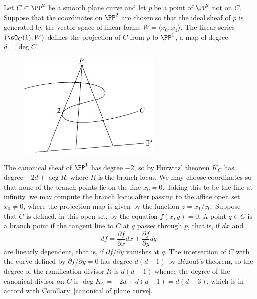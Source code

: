 \begin{example}
Let $C\subset \PP^2$ be a smooth plane curve and let $p$ be a point of $\PP^2$ not on $C$. Suppose that the coordinates on $\PP^2$ are chosen so that the ideal sheaf of $p$ is  
 generated by the vector space of linear forms $W = \langle x_0,x_1\rangle$. 
The linear series $(\sO_C(1), W)$ defines the projection of $C$ from $p$ to $\PP^1$, a map of degree
$d = \deg C$.

\begin{figure}   %
\centerline {\includegraphics[height=2in]{"main/Fig02-ProjectionPlaneCubic"}}
\end{figure}

The canonical sheaf of $\PP^1$ has degree $-2$, so by Hurwitz' theorem
$K_C$ has degree $ -2d+ \deg R$, where $R$ is the branch locus. We may choose coordinates
so that none of the branch points lie on the line $x_0 = 0$. Taking this to be the line at infinity, we
may compute the branch locus after passing to the affine open set $x_0\neq 0$, where the projection
map is given by the function $z = x_1/x_0$.  Suppose that $C$ is defined, in this open set,
by the equation $f(x,y)= 0$. A point $q\in C$ is a branch point if the tangent line to $C$ at $q$
passes through $p$, that is, if $dx$  and 
$$
df = \frac{\partial f}{\partial x} dx + \frac{\partial f}{\partial y} dy
$$
are linearly dependent, that is, if $\partial f/{\partial y}$ vanishes at $q$. The intersection of 
$C$ with the curve defined by $\partial f/{\partial y}=0$ has degree $d(d-1)$ by B\'ezout's theorem,
so the degree of the ramification divisor $R$ is $d(d-1)$ whence the degree of the canonical
divisor on $C$ is $\deg K_C = -2d+d(d-1) = d(d-3)$, which is in accord with 
Corollary~\ref{canonical of plane curve}.

\end{example}

